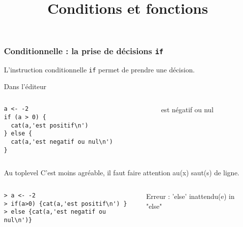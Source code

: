 \documentclass[10pt]{beamer}
\title{Conditions et fonctions}
\begin{document}
\maketitle


\begin{frame}[fragile]
  \frametitle{Conditionnelle : la prise de décisions \texttt{if}}
  \alert{L'instruction conditionnelle \texttt{if} permet de prendre une décision.}

  \begin{block}{Dans l'éditeur}
    \begin{columns}[c]
      \begin{column}{0.53\textwidth}
  \begin{lstlisting}[style=editor]
a <- -2
if (a > 0) {
  cat(a,'est positif\n')
} else {
  cat(a,'est negatif ou nul\n')
}    
\end{lstlisting}

\end{column}
\begin{column}{0.47\textwidth}
   est négatif ou nul
\end{column}
\end{columns} 
  \end{block}
  


\begin{block}{Au toplevel}
  C'est moins agréable, il faut faire attention au(x) saut(s) de ligne.
\end{block}
\begin{columns}[c]
\begin{column}{0.65\textwidth}
  \begin{lstlisting}
> a <- -2
> if(a>0) {cat(a,'est positif\n') }
> else {cat(a,'est negatif ou nul\n')}
  \end{lstlisting}
\end{column}
\begin{column}{0.35\textwidth}
  \RUN 
  \alert{Erreur : 'else' inattendu(e) in "else"}
\end{column}
\end{columns}
\end{frame}
\end{document}
